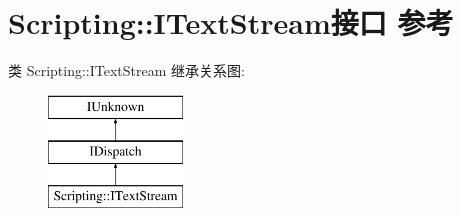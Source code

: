\hypertarget{interface_scripting_1_1_i_text_stream}{}\section{Scripting\+:\+:I\+Text\+Stream接口 参考}
\label{interface_scripting_1_1_i_text_stream}
类 Scripting\+:\+:I\+Text\+Stream 继承关系图\+:\begin{figure}[H]
\begin{center}
\leavevmode
\includegraphics[height=3.000000cm]{interface_scripting_1_1_i_text_stream}
\end{center}
\end{figure}
